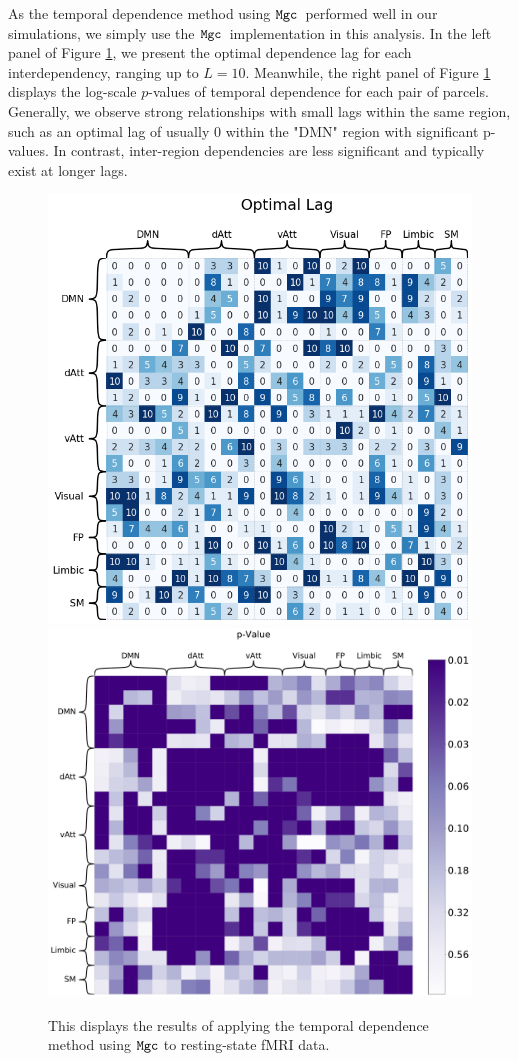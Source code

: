 As the temporal dependence method using $\mathtt{Mgc}$~performed well in our simulations, we simply use the $\mathtt{Mgc}$~implementation in this analysis. In the left panel of Figure \ref{fig:app}, we present the optimal dependence lag for each interdependency, ranging up to $L=10$. Meanwhile, the right panel of Figure \ref{fig:app} displays the log-scale $p$-values of temporal dependence for each pair of parcels. Generally, we observe strong relationships with small lags within the same region, such as an optimal lag of usually $0$ within the "DMN" region with significant p-values. In contrast, inter-region dependencies are less significant and typically exist at longer lags.
% 

\begin{figure}
    \centering
    \includegraphics[width=0.42\linewidth]{figures/mgcx/optimal_lag.png}
    \includegraphics[width=0.48\linewidth]{figures/mgcx/pval.pdf}
    \caption{This displays the results of applying the temporal dependence method using $\mathtt{Mgc}$ to resting-state fMRI data. 
    }
    \label{fig:app}
\end{figure}



